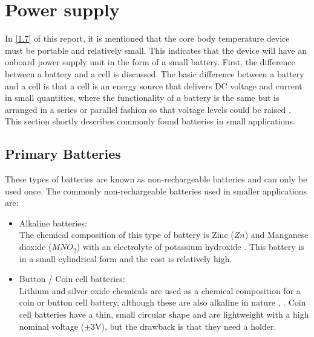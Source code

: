 \section{Power supply}
In \autoref{1.7} of this report, it is mentioned that the core body temperature device must be portable and relatively small. This indicates that the device will have an onboard power supply unit in the form of a small battery. First, the difference between a battery and a cell is discussed. The basic difference between a battery and a cell is that a cell is an energy source that delivers DC voltage and current in small quantities, where the functionality of a battery is the same but is arranged in a series or parallel fashion so that voltage levels could be raised \cite{Components2019}. This section shortly describes commonly found batteries in small applications.  

\subsection{Primary Batteries}
These types of batteries are known as non-rechargeable batteries and can only be used once. The commonly non-rechargeable batteries used in smaller applications are:
\begin{itemize}
	\item Alkaline batteries:\\
	The chemical composition of this type of battery is Zinc ($Zn$) and Manganese dioxide ($MNO_{2}$) with an electrolyte of potassium hydroxide \cite{Components2019}. This battery is in a small cylindrical form and the cost is relatively high. 
	\item Button / Coin cell batteries:\\
	Lithium and silver oxide chemicals are used as a chemical composition for a coin or button cell battery, although these are also alkaline in nature \cite{Components2019}, \cite{Battery2019}. Coin cell batteries have a thin, small circular shape and are lightweight with a high nominal voltage ($\pm$3V), but the drawback is that they need a holder. 
\end{itemize}

